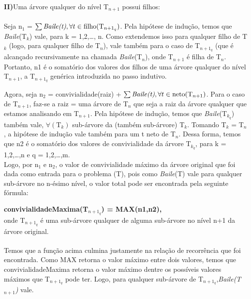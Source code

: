 \documentclass[a4paper]{article}
\begin{document}
\textbf{II)}Uma árvore qualquer do nível T$_{n+1}$ possui filhos:
\paragraph{}Seja n$_1$ = $\sum \text{\emph{Baile(t)}}, \forall t \in \text{filho(T$_{n+1_q}$)}$. Pela hipótese de indução, temos que \emph{Baile}(T$_k$) vale, para k = 1,2,\ldots, n. Como extendemos isso para qualquer filho de T$_k$ (logo, para qualquer filho de T$_n$), vale também para o caso de T$_{n+1_q}$ (que é alcançado recursivamente na chamada \emph{Baile}(T$_n$), onde T$_{n+1}$ é filha de T$_n$.  Portanto, n1 é o somatório dos valores dos filhos de uma árvore qualquer do nível T$_{n+1}$, a T$_{n+1_q}$ genérica introduzida no passo indutivo.

Agora, seja n$_2$ = convivialidade(raiz) + $\sum \text{\emph{Baile(t)}}, \forall t \in \text{neto(T$_{n+1}$)}$. Para o caso de T$_{n+1}$, faz-se a raiz = uma árvore de T$_n$ que seja a raiz da árvore qualquer que estamos analisando em T$_{n+1}$. Pela hipótese de indução, temos que \emph{Baile}(T$_{k_q}$) também vale, $\forall(\text{T}_k)$  sub-árvore da (também sub-árvore) T$_k$. Tomando T$_k$ = T$_n$, a hipótese de indução vale também para um t neto de T$_n$. Dessa forma, temos que n2 é o somatório dos valores de convivialidade da árvore T$_{k_q}$, para k = 1,2,\ldots,n e q = 1,2,\ldots,m.\\
Logo, por n$_1$ e n$_2$, o valor de convivialidade máximo da árvore original que foi dada como entrada para o problema (T), pois como  \emph{Baile}(T)  vale para qualquer sub-árvore no n-ésimo nível, o valor total pode ser encontrada pela seguinte fórmula:\\
\begin{center} \textbf{convivialidadeMaxima(T$_{n+1_q}$) =  MAX(n1,n2),} \\onde T$_{n+1_q}$ é uma sub-árvore qualquer de alguma sub-árvore no nível n+1 da árvore original.\\
\end{center}

\paragraph{}Temos que a função acima culmina justamente na relação de recorrência que foi encontrada. Como MAX retorna o valor máximo entre dois valores, temos que convivialidadeMaxima retorna o valor máximo dentre os possíveis valores máximos que T$_{n+1_q}$ pode ter. Logo, para qualquer sub-árvore de T$_{n+1_q}$,\emph{Baile(T$_{n+1}$)} vale.
\end{document}
